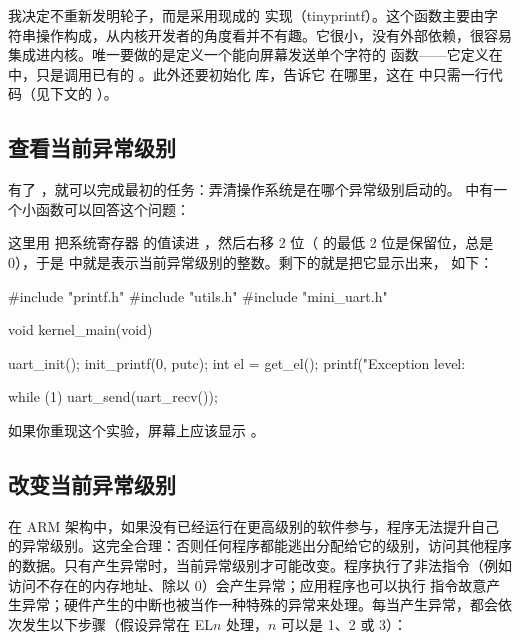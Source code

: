 我决定不重新发明轮子，而是采用现成的  实现（tinyprintf）。这个函数主要由字符串操作构成，从内核开发者的角度看并不有趣。它很小，没有外部依赖，很容易集成进内核。唯一要做的是定义一个能向屏幕发送单个字符的  函数——它定义在  中，只是调用已有的 。此外还要初始化  库，告诉它  在哪里，这在  中只需一行代码（见下文的 ）。

\subsection{查看当前异常级别}

有了 ，就可以完成最初的任务：弄清操作系统是在哪个异常级别启动的。 中有一个小函数可以回答这个问题：


这里用  把系统寄存器  的值读进 ，然后右移 2 位（ 的最低 2 位是保留位，总是 0），于是  中就是表示当前异常级别的整数。剩下的就是把它显示出来， 如下：

\begin{ccode}
#include "printf.h"
#include "utils.h"
#include "mini_uart.h"

void kernel_main(void)
{
	uart_init();
	init_printf(0, putc);
	int el = get_el();
	printf("Exception level: %

	while (1) {
		uart_send(uart_recv());
	}
}
\end{ccode}

如果你重现这个实验，屏幕上应该显示 。

\subsection{改变当前异常级别}

在 ARM 架构中，如果没有已经运行在更高级别的软件参与，程序无法提升自己的异常级别。这完全合理：否则任何程序都能逃出分配给它的级别，访问其他程序的数据。只有产生异常时，当前异常级别才可能改变。程序执行了非法指令（例如访问不存在的内存地址、除以 0）会产生异常；应用程序也可以执行  指令故意产生异常；硬件产生的中断也被当作一种特殊的异常来处理。每当产生异常，都会依次发生以下步骤（假设异常在 EL$n$ 处理，$n$ 可以是 1、2 或 3）：

